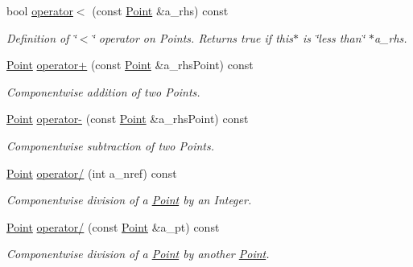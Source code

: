 \begin{DoxyCompactItemize}
bool \hyperlink{class_point_ab93641cb4a786c87778c63ad23e9ec0b}{operator$<$} (const \hyperlink{class_point}{Point} \&a\+\_\+rhs) const
\begin{DoxyCompactList}\small\item\em Definition of \char`\"{}$<$\char`\"{} operator on Points. Returns true if this$\ast$ is \char`\"{}less than\char`\"{} $\ast$a\+\_\+rhs. \end{DoxyCompactList}\item 
\mbox{\label{class_point_a33ef2fd0c9e91605f6cd986e99e9fd06}} 
\hyperlink{class_point}{Point} \hyperlink{class_point_a33ef2fd0c9e91605f6cd986e99e9fd06}{operator+} (const \hyperlink{class_point}{Point} \&a\+\_\+rhs\+Point) const
\begin{DoxyCompactList}\small\item\em Componentwise addition of two Points. \end{DoxyCompactList}\item 
\mbox{\label{class_point_a2d918abfc8d84e03b890878778180fd3}} 
\hyperlink{class_point}{Point} \hyperlink{class_point_a2d918abfc8d84e03b890878778180fd3}{operator-\/} (const \hyperlink{class_point}{Point} \&a\+\_\+rhs\+Point) const
\begin{DoxyCompactList}\small\item\em Componentwise subtraction of two Points. \end{DoxyCompactList}\item 
\hyperlink{class_point}{Point} \hyperlink{class_point_a4f8c24c02a61c5727fa4e049638feba7}{operator/} (int a\+\_\+nref) const
\begin{DoxyCompactList}\small\item\em Componentwise division of a \hyperlink{class_point}{Point} by an Integer. \end{DoxyCompactList}\item 
\hyperlink{class_point}{Point} \hyperlink{class_point_a15d362c09b31d632a0f3cd5e7a96eef7}{operator/} (const \hyperlink{class_point}{Point} \&a\+\_\+pt) const
\begin{DoxyCompactList}\small\item\em Componentwise division of a \hyperlink{class_point}{Point} by another \hyperlink{class_point}{Point}. \end{DoxyCompactList}\item 
\mbox{\label{class_point_a0e08b54dfb11c2c54907eb0b6aa54dae}} 

\end{DoxyCompactItemize}
